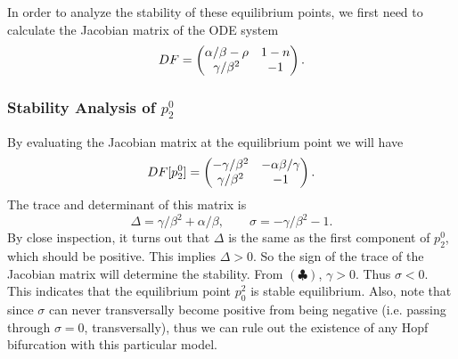 %	

In order to analyze the stability of these equilibrium points, we first need to calculate the Jacobian matrix of the ODE system 
\[ DF = \begin{pmatrix} \alpha/\beta-\rho & 1-n \\ \gamma/\beta^2 & -1 \end{pmatrix}. \]

\subsubsection{Stability Analysis of $p^0_2$}
By evaluating the Jacobian matrix at the equilibrium point we will have
\[ DF[p^0_2] = \begin{pmatrix} -\gamma/\beta^2 & -\alpha\beta/\gamma \\ \gamma/\beta^2 & -1 \end{pmatrix}. \]
The trace and determinant of this matrix is
\[  \Delta = \gamma/\beta^2 + \alpha/\beta, \qquad \sigma=-\gamma/\beta^2 - 1.  \]
By close inspection, it turns out that $\Delta$ is the same as the first component of $p^0_2$, which should be positive. This implies $\Delta > 0$. So the sign of the trace of the Jacobian matrix will determine the stability. From $(\clubsuit)$, $\gamma>0$. Thus $\sigma < 0$. This indicates that the equilibrium point $p_0^2$ is stable equilibrium. Also, note that since $\sigma$ can never transversally become positive from being negative (i.e. passing through $\sigma=0$, transversally), thus we can rule out the existence of any Hopf bifurcation with this particular model.

